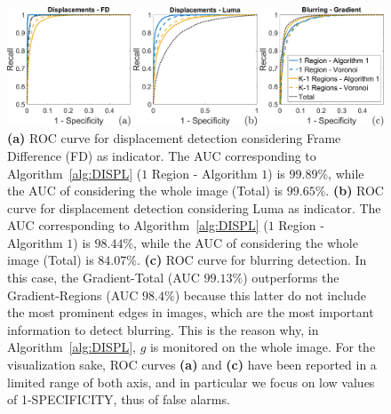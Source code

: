 \documentclass{llncs}
\begin{document}
\begin{figure}[t]
\centering
\includegraphics[width=1\linewidth]{Immagini/curve}
\caption{\textbf{(a)} ROC curve for displacement detection considering Frame Difference (FD) as indicator.
	The AUC corresponding to Algorithm~\ref{alg:DISPL} ($1$ Region - Algorithm $1$) is $99.89\%$, while the AUC of considering the whole image (Total) is $99.65\%$. 
	\textbf{(b)} ROC curve for displacement detection considering Luma as indicator.
	The AUC corresponding to Algorithm~\ref{alg:DISPL} ($1$ Region - Algorithm $1$) is $98.44\%$, while the AUC of considering the whole image (Total) is $84.07\%$. 
	\textbf{(c)} ROC curve for blurring detection.
	In this case, the Gradient-Total (AUC $99.13\%$) outperforms the Gradient-Regions (AUC $98.4\%$) because this latter do not include the most prominent edges in images, which are the most important information to detect blurring. This is the reason why, in Algorithm~\ref{alg:DISPL}, $g$ is monitored on the whole image. 
	For the visualization sake, ROC curves \textbf{(a)} and \textbf{(c)} have been reported in a limited range of both axis, and in particular we focus on low values of 1-SPECIFICITY, thus of false alarms.
	}
\label{fig:ROC}
\end{figure}
\end{document}

